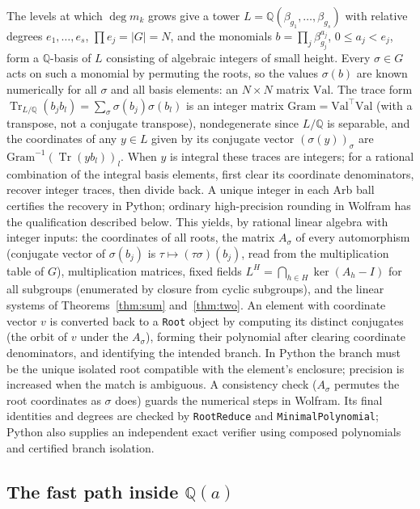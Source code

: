 \documentclass[11pt,a4paper]{article}
\theoremstyle{definition}
\theoremstyle{remark}
\newcommand{\Q}{\mathbb{Q}}
\newcommand{\Tr}{\operatorname{Tr}}
\newcommand{\code}[1]{\texttt{#1}}
\newcommand{\Root}{\code{Root}}
\begin{document}
The levels at which $\deg m_k$ grows give a tower $L=\Q(\beta_{g_1},\dots,\beta_{g_s})$ with relative
degrees $e_1,\dots,e_s$, $\prod e_j=|G|=N$, and the monomials $b=\prod_j\beta_{g_j}^{a_j}$,
$0\le a_j<e_j$, form a $\Q$-basis of $L$ consisting of algebraic integers of small height.  Every
$\sigma\in G$ acts on such a monomial by permuting the roots, so the values $\sigma(b)$ are known
numerically for all $\sigma$ and all basis elements: an $N\times N$ matrix $\mathrm{Val}$.  The trace
form $\Tr_{L/\Q}(b_jb_l)=\sum_\sigma\sigma(b_j)\sigma(b_l)$ is an integer matrix $\mathrm{Gram}=
\mathrm{Val}^\top\mathrm{Val}$ (with a transpose, not a conjugate transpose), nondegenerate since $L/\Q$ is separable, and the
coordinates of any $y\in L$ given by its conjugate vector $(\sigma(y))_\sigma$ are
$\mathrm{Gram}^{-1}(\Tr(yb_l))_l$.  When $y$ is integral these traces are integers; for a rational
combination of the integral basis elements, first clear its coordinate denominators, recover integer
traces, then divide back.  A unique integer in each Arb ball certifies the recovery in Python; ordinary
high-precision rounding in Wolfram has the qualification described below.  This yields, by rational
linear algebra with integer inputs: the coordinates of all roots, the matrix $A_\sigma$ of every
automorphism (conjugate vector of $\sigma(b_j)$ is $\tau\mapsto(\tau\sigma)(b_j)$, read from the
multiplication table of $G$), multiplication matrices, fixed fields $L^H=\bigcap_{h\in H}
\ker(A_h-I)$ for all subgroups (enumerated by closure from cyclic subgroups), and the linear systems of
Theorems~\ref{thm:sum} and~\ref{thm:two}.  An element with coordinate vector $v$ is converted back to
a \Root{} object by computing its distinct conjugates (the orbit of $v$ under the $A_\sigma$), forming
their polynomial after clearing coordinate denominators, and identifying the intended branch.  In
Python the branch must be the unique isolated root compatible with the element's enclosure;
precision is increased when the match is ambiguous.  A consistency check ($A_\sigma$ permutes the
root coordinates as $\sigma$ does) guards the numerical steps in Wolfram.  Its final identities and
degrees are checked by \code{RootReduce} and \code{MinimalPolynomial}; Python also supplies an
independent exact verifier using composed polynomials and certified branch isolation.

\subsection{The fast path inside \texorpdfstring{$\Q(a)$}{Q(a)}}
\end{document}

